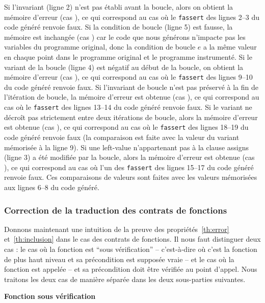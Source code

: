 Si l'invariant (ligne 2) n'est pas établi avant la boucle, alors on obtient
la mémoire d'erreur (cas ), ce qui correspond au cas où le
\lstinline'fassert' des lignes 2--3 du code généré renvoie faux.
Si la condition de boucle (ligne 5) est fausse, la mémoire est inchangée
(cas ) car le code que nous générons n'impacte pas les
variables du programme original, donc la condition de boucle $e$ a la
même valeur en chaque point dans le programme original et le programme
instrumenté.
Si le variant de la boucle (ligne 4) est négatif au début de la boucle, on
obtient la mémoire d'erreur (cas ), ce qui correspond au cas
où le \lstinline'fassert' des lignes 9--10 du code généré renvoie faux.
Si l'invariant de boucle n'est pas préservé à la fin de l'itération de boucle,
la mémoire d'erreur est obtenue (cas ), ce qui
correspond au cas où le \lstinline'fassert' des lignes 13--14 du code généré
renvoie faux.
Si le variant ne décroît pas strictement entre deux itérations de boucle, alors
la mémoire d'erreur est obtenue (cas ), ce qui
correspond au cas où le \lstinline'fassert' des lignes 18--19 du code généré
renvoie faux (la comparaison est faite avec la valeur du variant mémorisée à la
ligne 9).
Si une left-value n'appartenant pas à la clause assigns (ligne 3) a été modifiée
par la boucle, alors la mémoire d'erreur est obtenue (cas ),
ce qui correspond au cas où l'un des \lstinline'fassert' des lignes 15--17 du
code généré renvoie faux.
Ces comparaisons de valeurs sont faites avec les valeurs mémorisées aux lignes
6--8 du code généré.




\subsubsection{Correction de la traduction des contrats de fonctions}


Donnons maintenant une intuition de la preuve des propriétés~\ref{th:error}
et~\ref{th:inclusion} dans le cas des contrats de fonctions.
Il nous faut distinguer deux cas : le
cas où la fonction est ``sous vérification'' -- c'est-à-dire où c'est la
fonction de plus haut niveau et sa précondition est supposée vraie -- et le cas
où la fonction est appelée -- et sa précondition doit être vérifiée au point
d'appel.
Nous traitons les deux cas de manière séparée dans les deux sous-parties
suivantes.


\textbf{Fonction sous vérification}


